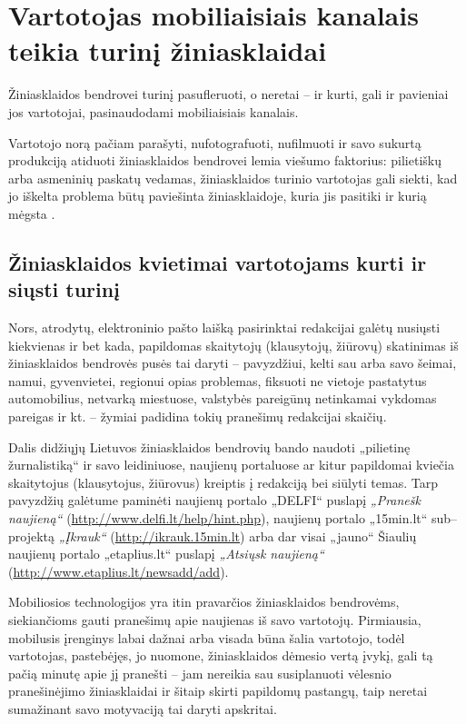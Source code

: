 \documentclass[kursinis-darbas]{vukf}
\begin{document}
\section{Vartotojas mobiliaisiais kanalais teikia turinį žiniasklaidai}

Žiniasklaidos bendrovei turinį pasufleruoti, o neretai – ir kurti, gali ir pavieniai jos vartotojai, pasinaudodami mobiliaisiais kanalais.

Vartotojo norą pačiam parašyti, nufotografuoti, nufilmuoti ir savo sukurtą produkciją atiduoti žiniasklaidos bendrovei lemia viešumo faktorius: pilietiškų arba asmeninių paskatų vedamas, žiniasklaidos turinio vartotojas gali siekti, kad jo iškelta problema būtų paviešinta žiniasklaidoje, kuria jis pasitiki ir kurią mėgsta \cite{ojr_what_is_participatory_journalism}.


\subsection{Žiniasklaidos kvietimai vartotojams kurti ir siųsti turinį}

Nors, atrodytų, elektroninio pašto laišką pasirinktai redakcijai galėtų nusiųsti kiekvienas ir bet kada, papildomas skaitytojų (klausytojų, žiūrovų) skatinimas iš žiniasklaidos bendrovės pusės tai daryti – pavyzdžiui, kelti sau arba savo šeimai, namui, gyvenvietei, regionui opias problemas, fiksuoti ne vietoje pastatytus automobilius, netvarką miestuose, valstybės pareigūnų netinkamai vykdomas pareigas ir kt. – žymiai padidina tokių pranešimų redakcijai skaičių.

Dalis didžiųjų Lietuvos žiniasklaidos bendrovių bando naudoti „pilietinę žurnalistiką“ ir savo leidiniuose, naujienų portaluose ar kitur papildomai kviečia skaitytojus (klausytojus, žiūrovus) kreiptis į redakciją bei siūlyti temas. Tarp pavyzdžių galėtume paminėti naujienų portalo „DELFI“ puslapį \emph{„Pranešk naujieną“} (\url{http://www.delfi.lt/help/hint.php}), naujienų portalo „15min.lt“ sub–projektą \emph{„Įkrauk“} (\url{http://ikrauk.15min.lt}) arba dar visai „jauno“ Šiaulių naujienų portalo „etaplius.lt“ puslapį \emph{„Atsiųsk naujieną“} (\url{http://www.etaplius.lt/newsadd/add}).

Mobiliosios technologijos yra itin pravarčios žiniasklaidos bendrovėms, siekiančioms gauti pranešimų apie naujienas iš savo vartotojų. Pirmiausia, mobilusis įrenginys labai dažnai arba visada būna šalia vartotojo, todėl vartotojas, pastebėjęs, jo nuomone, žiniasklaidos dėmesio vertą įvykį, gali tą pačią minutę apie jį pranešti – jam nereikia sau susiplanuoti vėlesnio pranešinėjimo žiniasklaidai ir šitaip skirti papildomų pastangų, taip neretai sumažinant savo motyvaciją tai daryti apskritai.
\end{document}
